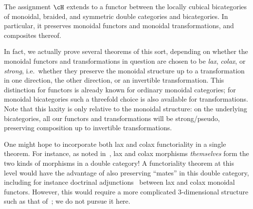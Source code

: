 \begin{thm}\label{thm:functor-intro}
  The assignment $\cH$ extends to a functor between the locally cubical bicategories of monoidal, braided, and symmetric double categories and bicategories.
  In particular, it preserves monoidal functors and monoidal transformations, and composites thereof.
\end{thm}

In fact, we actually prove several theorems of this sort, depending on whether the monoidal functors and transformations in question are chosen to be \emph{lax}, \emph{colax}, or \emph{strong}, i.e.\ whether they preserve the monoidal structure up to a transformation in one direction, the other direction, or an invertible transformation.
This distinction for functors is already known for ordinary monoidal categories; for monoidal bicategories such a threefold choice is also available for transformations.
Note that this laxity is only relative to the monoidal structure: on the underlying bicategories, all our functors and transformations will be strong/pseudo, preserving composition up to invertible transformations.

One might hope to incorporate both lax and colax functoriality in a single theorem.
For instance, as noted in~\cite{gp:double-adjoints,shulman:dblderived}, lax and colax morphisms \emph{themselves} form the two kinds of morphisms in a double category!
A functoriality theorem at this level would have the advantage of also preserving ``mates'' in this double category, including for instance doctrinal adjunctions~\cite{kelly:doc-adjn} between lax and colax monoidal functors.
However, this would require a more complicated 3-dimensional structure such as that of~\cite{gp:intercategories-i}; we do not pursue it here.

